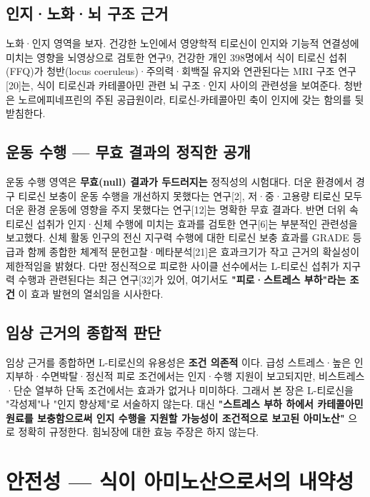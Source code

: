 \documentclass[12pt,oneside]{book}
\begin{document}
\subsection{인지·노화·뇌 구조 근거}

노화·인지 영역을 보자. 건강한 노인에서 영양학적 티로신이 인지와 기능적 연결성에 미치는 영향을 뇌영상으로 검토한 연구9, 건강한 개인 398명에서 식이 티로신 섭취(FFQ)가 청반(locus coeruleus)·주의력·회백질 유지와 연관된다는 MRI 구조 연구[20]는, 식이 티로신과 카테콜아민 관련 뇌 구조·인지 사이의 관련성을 보여준다. 청반은 노르에피네프린의 주된 공급원이라, 티로신-카테콜아민 축이 인지에 갖는 함의를 뒷받침한다.

\subsection{운동 수행 — 무효 결과의 정직한 공개}

운동 수행 영역은 \textbf{무효(null) 결과가 두드러지는} 정직성의 시험대다. 더운 환경에서 경구 티로신 보충이 운동 수행을 개선하지 못했다는 연구[2], 저·중·고용량 티로신 모두 더운 환경 운동에 영향을 주지 못했다는 연구[12]는 명확한 무효 결과다. 반면 더위 속 티로신 섭취가 인지·신체 수행에 미치는 효과를 검토한 연구[6]는 부분적인 관련성을 보고했다. 신체 활동 인구의 전신 지구력 수행에 대한 티로신 보충 효과를 GRADE 등급과 함께 종합한 체계적 문헌고찰·메타분석[21]은 효과크기가 작고 근거의 확실성이 제한적임을 밝혔다. 다만 정신적으로 피로한 사이클 선수에서는 L-티로신 섭취가 지구력 수행과 관련된다는 최근 연구[32]가 있어, 여기서도 \textbf{"피로·스트레스 부하"라는 조건} 이 효과 발현의 열쇠임을 시사한다.

\subsection{임상 근거의 종합적 판단}

임상 근거를 종합하면 L-티로신의 유용성은 \textbf{조건 의존적} 이다. 급성 스트레스·높은 인지부하·수면박탈·정신적 피로 조건에서는 인지·수행 지원이 보고되지만, 비스트레스·단순 열부하 단독 조건에서는 효과가 없거나 미미하다. 그래서 본 장은 L-티로신을 "각성제"나 "인지 향상제"로 서술하지 않는다. 대신 \textbf{"스트레스 부하 하에서 카테콜아민 원료를 보충함으로써 인지 수행을 지원할 가능성이 조건적으로 보고된 아미노산"} 으로 정확히 규정한다. 힘뇌장에 대한 효능 주장은 하지 않는다.

\section{안전성 — 식이 아미노산으로서의 내약성}
\end{document}
